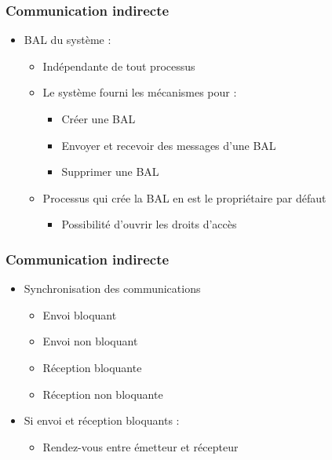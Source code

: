 \begin{frame}
\frametitle{Communication indirecte}
\begin{itemize}
\item BAL du système :
\begin{itemize}
\item Indépendante de tout processus
\item Le système fourni les mécanismes pour :
\begin{itemize}
\item Créer une BAL
\item Envoyer et recevoir des messages d’une BAL
\item Supprimer une BAL
\end{itemize}
\item Processus qui crée la BAL en est le propriétaire par défaut
\begin{itemize}
\item Possibilité d’ouvrir les droits d’accès
\end{itemize}
\end{itemize}
\end{itemize}
\end{frame}

\begin{frame}
\frametitle{Communication indirecte}
\begin{itemize}
\item Synchronisation des communications
\begin{itemize}
\item Envoi bloquant
\item Envoi non bloquant
\item Réception bloquante
\item Réception non bloquante
\end{itemize}
\item Si envoi et réception bloquants :
\begin{itemize}
\item Rendez-vous entre émetteur et récepteur
\end{itemize}
\end{itemize}
\end{frame}

